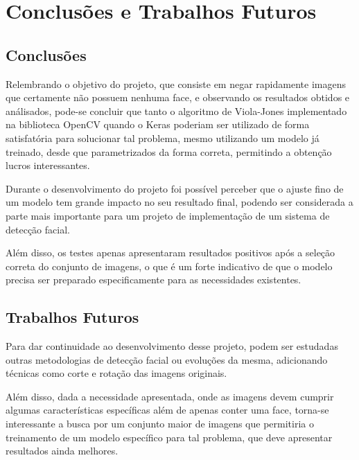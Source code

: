 \chapter{Conclusões e Trabalhos Futuros}\label{cap:conclusao}

\section{Conclusões}

Relembrando o objetivo do projeto, que consiste em negar rapidamente imagens que certamente não possuem nenhuma face, e observando os resultados obtidos e análisados, pode-se concluir que tanto o algoritmo de Viola-Jones implementado na biblioteca OpenCV quando o Keras poderiam ser utilizado de forma satisfatória para solucionar tal problema, mesmo utilizando um modelo já treinado, desde que parametrizados da forma correta, permitindo a obtenção lucros interessantes.

Durante o desenvolvimento do projeto foi possível perceber que o ajuste fino de um modelo tem grande impacto no seu resultado final, podendo ser considerada a parte mais importante para um projeto de implementação de um sistema de detecção facial.

Além disso, os testes apenas apresentaram resultados positivos após a seleção correta do conjunto de imagens, o que é um forte indicativo de que o modelo precisa ser preparado especificamente para as necessidades existentes.

\section{Trabalhos Futuros}

Para dar continuidade ao desenvolvimento desse projeto, podem ser estudadas outras metodologias de detecção facial ou evoluções da mesma, adicionando técnicas como corte e rotação das imagens originais.

Além disso, dada a necessidade apresentada, onde as imagens devem cumprir algumas características específicas além de apenas conter uma face, torna-se interessante a busca por um conjunto maior de imagens que permitiria o treinamento de um modelo específico para tal problema, que deve apresentar resultados ainda melhores.
